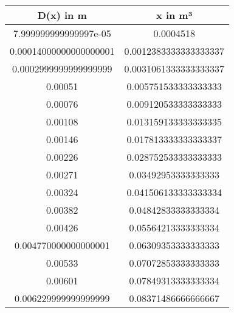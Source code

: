 \begin{table}\caption{}
\label{}
\centering
{}
\begin{tabular}{S[]S[]} 
\toprule
{D(x) in m} & {x in m³}\\
\midrule
7.999999999999997e-05 & 0.0004518\\
0.00014000000000000001 & 0.0012383333333333337\\
0.0002999999999999999 & 0.0031061333333333337\\
0.00051 & 0.005751533333333333\\
0.00076 & 0.009120533333333333\\
0.00108 & 0.013159133333333335\\
0.00146 & 0.017813333333333337\\
0.00226 & 0.028752533333333333\\
0.00271 & 0.03492953333333333\\
0.00324 & 0.041506133333333334\\
0.00382 & 0.04842833333333334\\
0.00426 & 0.05564213333333334\\
0.004770000000000001 & 0.06309353333333333\\
0.00533 & 0.07072853333333333\\
0.00601 & 0.07849313333333334\\
0.006229999999999999 & 0.08371486666666667\\
\bottomrule
\end{tabular}\end{table}